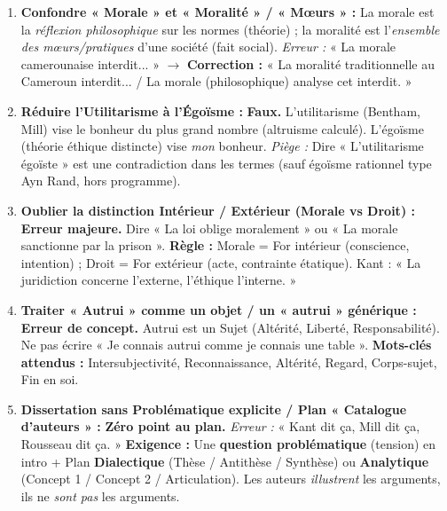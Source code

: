 \documentclass[11pt]{article}
\newcommand{\cle}[1]{{\popxbold\color{popdark}#1}}
\begin{document}
\begin{attention}
\begin{enumerate}
    \item \textbf{Confondre « Morale » et « Moralité » / « Mœurs » :} La \cle{morale} est la \emph{réflexion philosophique} sur les normes (théorie) ; la \cle{moralité} est l'\emph{ensemble des mœurs/pratiques} d'une société (fait social). \textit{Erreur :} « La morale camerounaise interdit... » $\rightarrow$ \textbf{Correction :} « La moralité traditionnelle au Cameroun interdit... / La morale (philosophique) analyse cet interdit. »
    \item \textbf{Réduire l'Utilitarisme à l'Égoïsme :} \textbf{Faux.} L'utilitarisme (Bentham, Mill) vise le \cle{bonheur du plus grand nombre} (altruisme calculé). L'\cle{égoïsme} (théorie éthique distincte) vise \emph{mon} bonheur. \textit{Piège :} Dire « L'utilitarisme égoïste » est une contradiction dans les termes (sauf égoïsme rationnel type Ayn Rand, hors programme).
    \item \textbf{Oublier la distinction \cle{Intérieur / Extérieur} (Morale vs Droit) :} \textbf{Erreur majeure.} Dire « La loi oblige moralement » ou « La morale sanctionne par la prison ». \textbf{Règle :} Morale = For intérieur (conscience, intention) ; Droit = For extérieur (acte, contrainte étatique). Kant : « La juridiction concerne l'externe, l'éthique l'interne. »
    \item \textbf{Traiter « Autrui » comme un objet / un « autrui » générique :} \textbf{Erreur de concept.} Autrui est un \cle{Sujet} (Altérité, Liberté, Responsabilité). Ne pas écrire « Je connais autrui comme je connais une table ». \textbf{Mots-clés attendus :} Intersubjectivité, Reconnaissance, Altérité, Regard, Corps-sujet, Fin en soi.
    \item \textbf{Dissertation sans Problématique explicite / Plan « Catalogue d'auteurs » :} \textbf{Zéro point au plan.} \textit{Erreur :} « Kant dit ça, Mill dit ça, Rousseau dit ça. » \textbf{Exigence :} Une \textbf{question problématique} (tension) en intro + Plan \textbf{Dialectique} (Thèse / Antithèse / Synthèse) ou \textbf{Analytique} (Concept 1 / Concept 2 / Articulation). Les auteurs \emph{illustrent} les arguments, ils ne \emph{sont pas} les arguments.
\end{enumerate}
\end{attention}

\newpage
\end{document}
